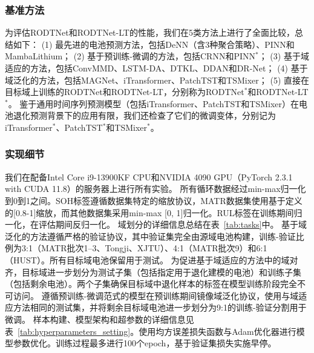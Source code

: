\documentclass[UTF8,lettersize,journal]{IEEEtran}
\begin{document}
\subsubsection{基准方法}

为评估RODTNet和RODTNet-LT的性能，我们在5类方法上进行了全面比较，总结如下：
% 
(1) 最先进的电池预测方法，包括DeNN\cite{10102497}（含3种聚合策略）、PINN\cite{wang2024physics}和MambaLithium\cite{shi2024mambalithiumselectivestatespace}；
(2) 基于预训练-微调的方法，包括CRNN\cite{D2EE01676A}和PINN$^\ast$\cite{wang2024physics}；
(3) 基于域适应的方法，包括ConvMMD\cite{9788003}、LSTM-DA\cite{HAN2022230823}、DTKL\cite{10029904}、DDAN\cite{9560040}和DR-Net\cite{WANG2023108897}；
(4) 基于域泛化的方法，包括MAGNet\cite{TAN2024103725}、iTransformer\cite{liu2024itransformer}、PatchTST\cite{nie2023a}和TSMixer\cite{chen2023tsmixer}；
(5) 直接在目标域上训练的RODTNet和RODTNet-LT，分别称为RODTNet$^\ast$和RODTNet-LT$^\ast$。
% 
鉴于通用时间序列预测模型（包括iTransformer、PatchTST和TSMixer）在电池退化预测背景下的应用有限，我们还检查了它们的微调变体，分别记为iTransformer$^\ast$、PatchTST$^\ast$和TSMixer$^\ast$。

\subsubsection{实现细节}

我们在配备Intel Core i9-13900KF CPU和NVIDIA 4090 GPU（PyTorch 2.3.1 with CUDA 11.8）的服务器上进行所有实验。
所有循环数据经过min-max归一化到0到1之间。SOH标签遵循数据集特定的缩放协议，MATR数据集使用基于定义的[0.8-1]缩放，而其他数据集采用min-max [0, 1]归一化。RUL标签在训练期间归一化，在评估期间反归一化。
% 
域划分的详细信息总结在表~\ref{tab:tasks}中。
% 
基于域泛化的方法遵循严格的验证协议\cite{9847099}，其中验证集完全由源域电池构建，训练-验证比例为3:1（MATR批次1–3、Tongji、XJTU）、4:1（MATR批次9）和6:1（HUST）。所有目标域电池保留用于测试。
% 
为促进基于域适应的方法中的域对齐，目标域进一步划分为测试子集（包括指定用于退化建模的电池）和训练子集（包括剩余电池）。两个子集确保目标域中退化样本的标签在模型训练阶段完全不可访问。
% 
遵循预训练-微调范式的模型在预训练期间镜像域泛化协议，使用与域适应方法相同的测试集，并将剩余目标域电池进一步划分为9:1的训练-验证分割用于微调。
% 
样本构建、模型架构和超参数的详细信息见表~\ref{tab:hyperparameters_setting}。使用均方误差损失函数与Adam优化器进行模型参数优化。训练过程最多进行100个epoch，基于验证集损失实施早停。
\end{document}
